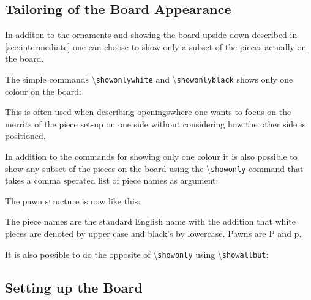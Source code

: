 \documentclass[10pt]{article}
\makeatletter
\renewcommand\showboard{\print@board}
\let\ORIshowboard\showboard
\renewcommand\showboard{%
    \makebox[8\squarelength]{%
    \rule{0pt}{9\squarelength}%
    \begin{postscript}%
    [trim = \squarelength{} 0pt \squarelength{} 0pt]
    \ORIshowboard
    \end{postscript}}}
\newcommand{\command}[1]{\textbackslash\texttt{#1}}
\makeatother
\begin{document}
\subsection{Tailoring of the Board Appearance}
\label{sec:tail-board-appe}

In additon to the ornaments and showing the board upside down
described in \ref{sec:intermediate} one can choose to show only a
subset of the pieces actually on the board.

The simple commands \command{showonlywhite} and \command{showonlyblack} shows
only one colour on the board:

\begin{LTXexample}
\newgame
{}

\showonlywhite
\showboard

\end{LTXexample}

\begin{LTXexample}
\showonlyblack
\showboard
\end{LTXexample}


This is often used when describing openingswhere one wants to focus on
the merrits of the piece set-up on one side without considering how
the other side is positioned.

In addition to the commands for showing only one colour it is also
possible to show any subset of the pieces on the board using the
\command{showonly} command that takes a comma sperated list of piece
names as argument:

\begin{LTXexample}
The pawn structure is
now like this:

\showboard
\end{LTXexample}

The piece names are the standard English name with the addition that
white pieces are denoted by upper case and black's by lowercase. Pawns
are P and p.

It is also possible to do the opposite of \command{showonly} using
\command{showallbut}:

\begin{LTXexample}
\showboard
\end{LTXexample}


\subsection{Setting up the Board}
\label{sec:setting-up-board}
\end{document}
